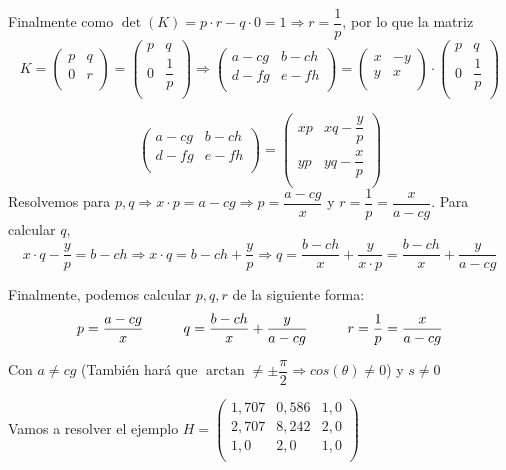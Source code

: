 \documentclass[12pt,a4paper]{article}
\begin{document}
	Finalmente como $\det(K)=p\cdot r - q\cdot 0 = 1\Rightarrow r=\dfrac{1}{p}$, por lo que la matriz
	$$K=\begin{pmatrix}
	p & q\\
	0 & r\\
	\end{pmatrix}=\begin{pmatrix}
	p & q\\
	0 & \dfrac{1}{p}\\
	\end{pmatrix}\Rightarrow  \begin{pmatrix}
	a-cg & b-ch\\
	d-fg & e-fh\\
	\end{pmatrix}=\begin{pmatrix}
	x & -y\\
	y & x\\
	\end{pmatrix}\cdot\begin{pmatrix}
	p & q\\
	0 & \dfrac{1}{p}\\
	\end{pmatrix}$$
	
	$$
	\begin{pmatrix}
	a-cg & b-ch\\
	d-fg & e-fh\\
	\end{pmatrix}=\begin{pmatrix}
	xp & xq-\dfrac{y}{p}\\
	yp & yq-\dfrac{x}{p}\\
	\end{pmatrix}
	$$
	Resolvemos para $p,q\Rightarrow x\cdot p=a-cg\Rightarrow p=\dfrac{a-cg}{x}$ y $r=\dfrac{1}{p}=\dfrac{x}{a-cg}$.
	Para calcular $q$,
	$$x\cdot q-\dfrac{y}{p}=b-ch\Rightarrow x\cdot q=b-ch + \dfrac{y}{p}\Rightarrow q=\dfrac{b-ch}{x} + \dfrac{y}{x\cdot p} = \dfrac{b-ch}{x} + \dfrac{y}{a-cg}$$
	
	Finalmente, podemos calcular $p, q, r$ de la siguiente forma:\newline
	$$p = \dfrac{a-cg}{x} \hspace{1.0cm} q = \dfrac{b-ch}{x} + \dfrac{y}{a-cg} \hspace{1.0cm} r = \dfrac{1}{p} = \dfrac{x}{a-cg}$$
	
	Con $a\neq cg$ (También hará que $\arctan \neq \pm \dfrac{\pi}{2} \Rightarrow cos(\theta)\neq 0$) y $s \neq 0$
	
	\newpage
	Vamos a resolver el ejemplo\newline\newline
	$H=
	\begin{pmatrix}
		1,707 & 0,586 & 1,0\\
		2,707 & 8,242 & 2,0\\
		1,0 & 2,0 & 1,0\\
	\end{pmatrix}
	 $
	 
\end{document}
